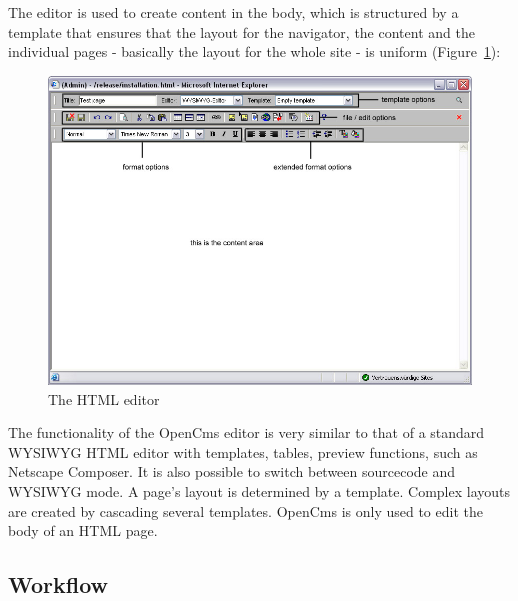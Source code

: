 The editor is used to create content in the body, which is
structured by a template that ensures that the layout for the
navigator, the content and the individual pages - basically the
layout for the whole site - is uniform
(Figure~\ref{thehtmleditor}):

\begin{figure}[!hbt]
\begin{center}
\includegraphics[width=\sgw]
                   {pics/usermanual/theHtmlEditor}
\caption[The HTML editor]
           {The HTML editor}
\label{thehtmleditor}
\end{center}
\end{figure}

The functionality of the OpenCms editor is very similar to that of
a standard WYSIWYG HTML editor with templates, tables, preview
functions, such as Netscape Composer. It is also possible to
switch between sourcecode and WYSIWYG mode. A page's layout is
determined by a template. Complex layouts are created by cascading
several templates. OpenCms is only used to edit the body of an HTML page.

\subsection{Workflow}

